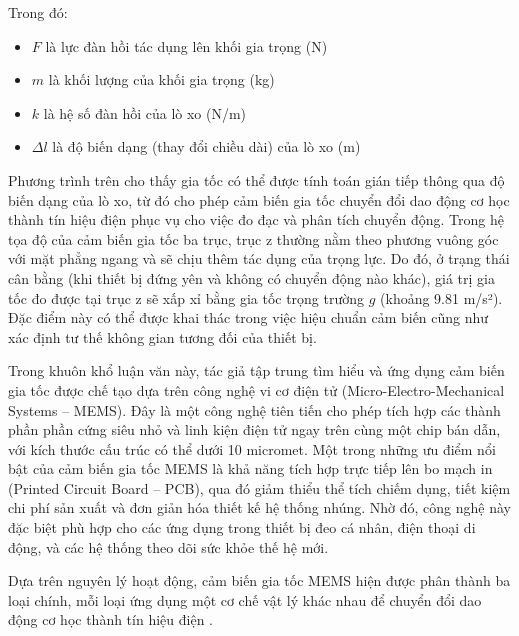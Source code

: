 Trong đó: \begin{itemize} \item $F$ là lực đàn hồi tác dụng lên khối gia trọng (N) \item $m$ là khối lượng của khối gia trọng (kg) \item $k$ là hệ số đàn hồi của lò xo (N/m) \item $\Delta l$ là độ biến dạng (thay đổi chiều dài) của lò xo (m) \end{itemize}

Phương trình trên cho thấy gia tốc có thể được tính toán gián tiếp thông qua độ biến dạng của lò xo, từ đó cho phép cảm biến gia tốc chuyển đổi dao động cơ học thành tín hiệu điện phục vụ cho việc đo đạc và phân tích chuyển động. Trong hệ tọa độ của cảm biến gia tốc ba trục, trục z thường nằm theo phương vuông góc với mặt phẳng ngang và sẽ chịu thêm tác dụng của trọng lực. Do đó, ở trạng thái cân bằng (khi thiết bị đứng yên và không có chuyển động nào khác), giá trị gia tốc đo được tại trục z sẽ xấp xỉ bằng gia tốc trọng trường $g$ (khoảng 9.81 m/s²). Đặc điểm này có thể được khai thác trong việc hiệu chuẩn cảm biến cũng như xác định tư thế không gian tương đối của thiết bị.

Trong khuôn khổ luận văn này, tác giả tập trung tìm hiểu và ứng dụng 
cảm biến gia tốc được chế tạo dựa trên công nghệ vi cơ điện tử (Micro-Electro-Mechanical Systems – MEMS). 
Đây là một công nghệ tiên tiến cho phép tích hợp các thành phần phần cứng siêu nhỏ và 
linh kiện điện tử ngay trên cùng một chip bán dẫn, với kích thước cấu trúc có thể dưới 
10 micromet. Một trong những ưu điểm nổi bật của cảm biến gia tốc MEMS là 
khả năng tích hợp trực tiếp lên bo mạch in (Printed Circuit Board – PCB), 
qua đó giảm thiểu thể tích chiếm dụng, tiết kiệm chi phí sản xuất và 
đơn giản hóa thiết kế hệ thống nhúng. Nhờ đó, công nghệ này đặc biệt phù hợp 
cho các ứng dụng trong thiết bị đeo cá nhân, điện thoại di động, và các 
hệ thống theo dõi sức khỏe thế hệ mới.


Dựa trên nguyên lý hoạt động, cảm biến gia tốc MEMS hiện được phân thành ba loại chính, mỗi loại ứng dụng một cơ chế vật lý khác nhau để chuyển đổi dao động cơ học thành tín hiệu điện \cite{Acce}\cite{cambien}.

